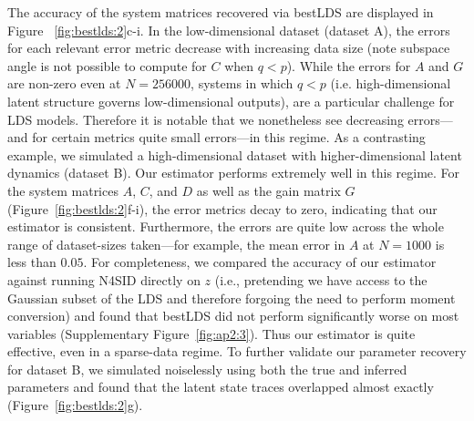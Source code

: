 The accuracy of the system matrices recovered via bestLDS are displayed in Figure ~\ref{fig:bestlds:2}c-i. In the low-dimensional dataset (dataset A), the errors for each relevant error metric decrease with increasing data size (note subspace angle is not possible to compute for $C$ when $q<p$). While the errors for $A$ and $G$ are non-zero even at $N=256000$, systems in which $q < p$ (i.e. high-dimensional latent structure governs low-dimensional outputs), are a particular challenge for LDS models. Therefore it is notable that we nonetheless see decreasing errors---and for certain metrics quite small errors---in this regime. As a contrasting example, we simulated a high-dimensional dataset with higher-dimensional latent dynamics (dataset B). Our estimator performs extremely well in this regime. For the system matrices $A$, $C$, and $D$ as well as the gain matrix $G$ (Figure~\ref{fig:bestlds:2}f-i), the error metrics decay to zero, indicating that our estimator is consistent. Furthermore, the errors are quite low across the whole range of dataset-sizes taken---for example, the mean error in $A$ at $N=1000$ is less than $0.05$. For completeness, we compared the accuracy of our estimator against running N4SID directly on $z$ (i.e., pretending we have access to the Gaussian subset of the LDS and therefore forgoing the need to perform moment conversion) and found that bestLDS did not perform significantly worse on most variables (Supplementary Figure~\ref{fig:ap2:3}). Thus our estimator is quite effective, even in a sparse-data regime. To further validate our parameter recovery for dataset B, we simulated noiselessly using both the true and inferred parameters and found that the latent state traces overlapped almost exactly (Figure~\ref{fig:bestlds:2}g). 

